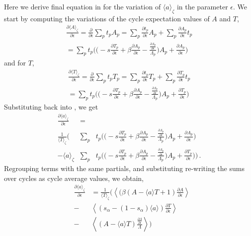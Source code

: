 \documentclass[aps,pre,
                showpacs,
                twocolumn,
                groupedaddress,
                floatfix]{revtex4-1}
\begin{document}
Here we derive final equation in  for the
variation of $\langle a\rangle_{\zeta}$ in the parameter $\epsilon$. We
start by computing the variations of the cycle expectation values of $A$
and $T$,
\begin{eqnarray*}
\frac{\partial \langle A \rangle_{\zeta}}{\partial \epsilon} = \frac{\partial}{\partial \epsilon}\sum_{p}t_{p}A_{p} = \sum_{p}\frac{\partial t_{p}}{\partial \epsilon}A_{p} + \sum_{p} \frac{\partial A_{p}}{\partial \epsilon} t_{p}
\\ = \sum_{p}t_{p}\Bigg( \Bigg( -s\frac{\partial T_{p}}{\partial \epsilon} + \beta \frac{\partial A_{p}}{\partial \epsilon} - \frac{\frac{\partial \Lambda_{p}}{\partial \epsilon}}{\Lambda_{p}}\Bigg) A_{p} +\frac{\partial A_{p}}{\partial \epsilon} \Bigg)
\end{eqnarray*}
and for $T$,
\begin{eqnarray*}
\frac{\partial \langle T \rangle_{\zeta}}{\partial \epsilon} = \frac{\partial}{\partial \epsilon}\sum_{p}t_{p}T_{p} = \sum_{p}\frac{\partial t_{p}}{\partial \epsilon}T_{p} + \sum_{p} \frac{\partial T_{p}}{\partial \epsilon} t_{p}
\\ = \sum_{p}t_{p}\Bigg( \Bigg( -s\frac{\partial T_{p}}{\partial \epsilon} + \beta \frac{\partial A_{p}}{\partial \epsilon} - \frac{\frac{\partial \Lambda_{p}}{\partial \epsilon}}{\Lambda_{p}}\Bigg) A_{p} +\frac{\partial T_{p}}{\partial \epsilon} \Bigg)
\end{eqnarray*}
Substituting back into , we get
\begin{eqnarray*}
\frac{\partial \langle a \rangle_{\zeta}}{\partial \epsilon} &=&
\\ \frac{1}{\langle T\rangle_{\zeta}}\Bigg( &\sum_{p}&t_{p}\Bigg( \Bigg( -s\frac{\partial T_{p}}{\partial \epsilon} + \beta \frac{\partial A_{p}}{\partial \epsilon} - \frac{\frac{\partial \Lambda_{p}}{\partial \epsilon}}{\Lambda_{p}}\Bigg) A_{p} +\frac{\partial A_{p}}{\partial \epsilon} \Bigg)
\\ - \langle a \rangle_{\zeta} &\sum_{p}&t_{p}\Bigg( \Bigg( -s\frac{\partial T_{p}}{\partial \epsilon} + \beta \frac{\partial A_{p}}{\partial \epsilon} - \frac{\frac{\partial \Lambda_{p}}{\partial \epsilon}}{\Lambda_{p}}\Bigg) A_{p} +\frac{\partial T_{p}}{\partial \epsilon} \Bigg) \Bigg)
\,.
\end{eqnarray*}
Regrouping terms with the same partials, and substituting re-writing the
sums  over cycles as cycle average values, we obtain,
\begin{eqnarray*}
&\frac{\partial \langle a\rangle_{\zeta}}{\partial \epsilon}& = \frac{1}{\langle T \rangle_{\zeta}}\Bigg( \left\langle (\beta(A-\langle a\rangle T + 1)\frac{\partial A}{\partial \epsilon}\right\rangle \\ &-& \left\langle (s_{\alpha}-(1-s_{\alpha})\langle a\rangle)\frac{\partial T}{\partial \epsilon}\right\rangle  \\
&-&\left\langle (A-\langle a \rangle T) \frac{\frac{\partial \Lambda}{\partial \epsilon}}{\Lambda}\right\rangle \Bigg)
\end{eqnarray*}

\ifboyscout
\newpage
    
\newpage
\fi


\end{document}
